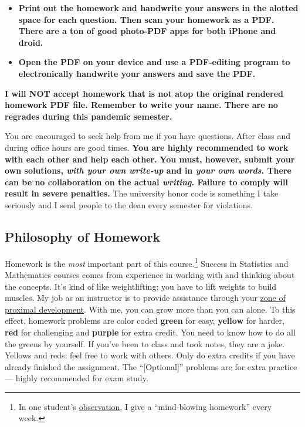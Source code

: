 \documentclass[12pt]{article}
\newcommand{\ingreen}[1]{\color{green}\textbf{#1} \color{black}}
\newcommand{\inyellow}[1]{\color{yellow}\textbf{#1} \color{black}}
\newcommand{\inred}[1]{\color{red}\textbf{#1} \color{black}}
\newcommand{\inpurple}[1]{\color{purple}\textbf{#1} \color{black}}
\newcommand{\qu}[1]{``#1''}
\begin{document}
\begin{itemize}
\item \textbf{Print out the homework and handwrite your answers in the alotted space for each question. Then scan your homework as a PDF. There are a ton of good photo-PDF apps for both iPhone and droid. }
\item \textbf{Open the PDF on your device and use a PDF-editing program to electronically handwrite your answers and save the PDF.}
\end{itemize}

\textbf{I will NOT accept homework that is not atop the original rendered homework PDF file. Remember to write your name. There are no regrades during this pandemic semester.}

You are encouraged to seek help from me if you have questions. After class and during office hours are good times. \ingreen{You are highly recommended to work with each other and help each other.} \inred{You must, however, submit your own solutions, \textit{with your own write-up} and in \textit{your own words}. There can be no collaboration on the actual \textit{writing}. Failure to comply will result in severe penalties.} The university honor code is something I take seriously and I send people to the dean every semester for violations.


\subsection*{Philosophy of Homework}


Homework is the \textit{most} important part of this course.\footnote{In one student's \href{http://www.ratemyprofessors.com/ShowRatings.jsp?tid=1951051}{observation}, I give a \qu{mind-blowing homework} every week.} Success in Statistics and Mathematics courses comes from experience in working with and thinking about the concepts. It's kind of like weightlifting; you have to lift weights to build muscles. My job as an instructor is to provide assistance through your \href{http://en.wikipedia.org/wiki/Zone_of_proximal_development}{zone of proximal development}. With me, you can grow more than you can alone. To this effect, homework problems are color coded \ingreen{green} for easy, \inyellow{yellow} for harder, \inred{red} for challenging and \inpurple{purple} for extra credit. You need to know how to do all the greens by yourself. If you've been to class and took notes, they are a joke. Yellows and reds: feel free to work with others. Only do extra credits if you have already finished the assignment. The \qu{[Optional]} problems are for extra practice --- highly recommended for exam study.
\end{document}
